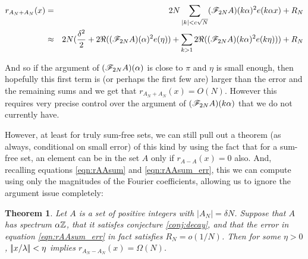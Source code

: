 \documentclass{report}
\newtheorem{theorem}{Theorem}[section]
\theoremstyle{remark}
\numberwithin{equation}{section}
\begin{document}
\begin{eqnarray*}
  r_{A_N + A_N}(x) &=& 2N \sum_{|k| < c\sqrt{N}}
                       (\mathscr{F}_{2N}A)(k\alpha)^2 e(k\alpha x) + R_N\\
                   &\approx& 2N (\frac{\delta^2}{2} +
                             2\Re((\mathscr{F}_{2N}A)(\alpha)^2 e(\eta)) + \sum_{k > 1}
                             2\Re((\mathscr{F}_{2N}A)(k\alpha)^2 e(k\eta))) + R_N\\
\end{eqnarray*}

And so if the argument of $(\mathscr{F}_{2N}A)(\alpha)$ is close to $\pi$ and
$\eta$ is small enough, then hopefully this first term is (or perhaps
the first few are) larger than the error and the remaining sums and we
get that $r_{A_N + A_N}(x) = O(N)$.  However this requires very
precise control over the argument of $(\mathscr{F}_{2N}A)(k\alpha)$ that we
do not currently have.

However, at least for truly sum-free sets, we can still pull out a
theorem (as always, conditional on small error) of this kind by using
the fact that for a sum-free set, an element can be in the set $A$
only if $r_{A-A}(x) = 0$ also.  And, recalling equations
\ref{eqn:rAAsum} and \ref{eqn:rAAsum_err}, this we can compute using
only the magnitudes of the Fourier coefficients, allowing us to ignore
the argument issue completely:

\begin{theorem}\label{thm:hole1}
  Let $A$ is a \relevant set of positive integers with
  $|A_N| = \delta N$.  Suppose that $A$ has spectrum $\alpha\mathbb{Z}$, that
  it satisfes conjecture \ref{conj:decay}, and that the error in
  equation \ref{eqn:rAAsum_err} in fact satisfies $R_N = o(1/N)$.
  Then for some $\eta > 0$, $|\!|x/\lambda|\!| < \eta$ implies
  $r_{A_N-A_N}(x) = \Omega(N)$.
\end{theorem}
\end{document}

